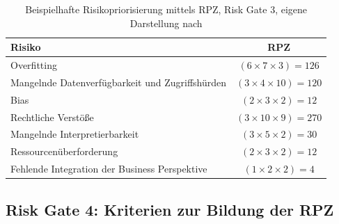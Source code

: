 \begin{table}[H]
\centering
\begin{tabular}{|p{9cm}|c|}
\hline
\textbf{Risiko} & \textbf{RPZ} \\ \hline
Overfitting & $(6 \times 7 \times 3) = 126$ \\ \hline
Mangelnde Datenverfügbarkeit und Zugriffshürden & $(3 \times 4 \times 10) = 120$ \\ \hline
Bias & $(2 \times 3 \times 2) = 12$ \\ \hline
Rechtliche Verstöße & $(3 \times 10 \times 9) = 270$ \\ \hline
Mangelnde Interpretierbarkeit & $(3 \times 5 \times 2) = 30$ \\ \hline
Ressourcenüberforderung & $(2 \times 3 \times 2) = 12$ \\ \hline
Fehlende Integration der Business Perspektive & $(1 \times 2 \times 2) = 4$ \\ \hline
\end{tabular}
\caption{Beispielhafte Risikopriorisierung mittels RPZ, Risk Gate 3, eigene Darstellung nach \cite{Bundesministerium_2018}}
\label{tab:cs2_app_rg3_rpz_risiken}
\end{table}

\subsection{Risk Gate 4: Kriterien zur Bildung der RPZ}


